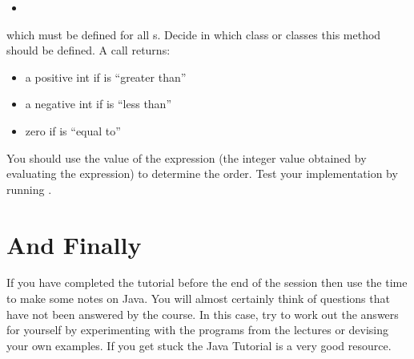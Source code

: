 \documentclass[11pt,a4paper]{article}
\begin{document}
\begin{itemize}
  \item {}
\end{itemize}

which must be defined for all s.
Decide in which class or classes this method should be defined.
A call  returns:

\begin{itemize}
  \item a positive int if  is ``greater than'' 
  \item a negative int if  is ``less than'' 
  \item zero if  is ``equal to'' 
\end{itemize}

You should use the value of the expression (the integer value obtained by
evaluating the expression) to determine the order.
Test your implementation by running .

\section{And Finally}

If you have completed the tutorial before the end of the session then
use the time to make some notes on Java.
You will almost certainly think of questions that have not been answered 
by the course.
In this case, try to work out the answers for yourself by experimenting
with the programs from the lectures or devising your own examples.
If you get stuck the Java Tutorial is a very good resource. 
\end{document}
